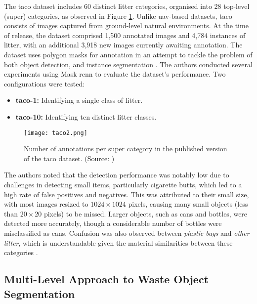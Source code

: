 The \gls{taco} dataset includes 60 distinct litter categories, organised into 28 top-level (super) categories, as observed in Figure \ref{fig:taco2}. Unlike \gls{uav}-based datasets, \gls{taco} consists of images captured from ground-level natural environments. At the time of release, the dataset comprised 1,500 annotated images and 4,784 instances of litter, with an additional 3,918 new images currently awaiting annotation. The dataset uses polygon masks for annotation in an attempt to tackle the problem of both object detection, and instance segmentation \cite{taco2020}.
The authors conducted several experiments using Mask \gls{rcnn} to evaluate the dataset's performance. Two configurations were tested:
\begin{itemize}
    \item \textbf{\gls{taco}-1:} Identifying a single class of litter.
    \item \textbf{\gls{taco}-10:} Identifying ten distinct litter classes.
\end{itemize}

\begin{figure}[ht]
    \centering
    \texttt{[image: taco2.png]}
    \caption{Number of annotations per super category in the published version of the \gls{taco} dataset. (Source: \cite{taco2020})}
    \label{fig:taco2}
\end{figure}

The authors noted that the detection performance was notably low due to challenges in detecting small items, particularly cigarette butts, which led to a high rate of false positives and negatives. This was attributed to their small size, with most images resized to $1024 \times 1024$ pixels, causing many small objects (less than $20 \times 20$ pixels) to be missed. Larger objects, such as cans and bottles, were detected more accurately, though a considerable number of bottles were misclassified as cans. Confusion was also observed between \textit{plastic bags} and \textit{other litter}, which is understandable given the material similarities between these categories \cite{taco2020}.

\subsection{Multi-Level Approach to Waste Object Segmentation}
\label{subsec:3_mju-waste}

